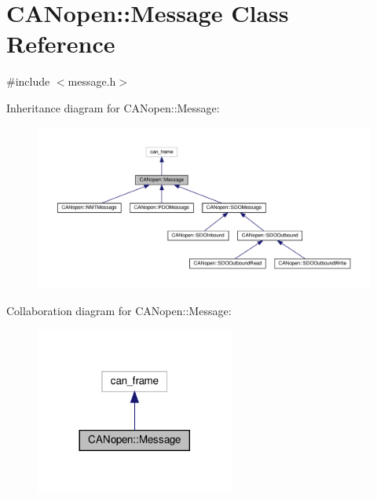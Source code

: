\hypertarget{class_c_a_nopen_1_1_message}{}\section{C\+A\+Nopen\+:\+:Message Class Reference}
\label{class_c_a_nopen_1_1_message}


{\ttfamily \#include $<$message.\+h$>$}



Inheritance diagram for C\+A\+Nopen\+:\+:Message\+:\nopagebreak
\begin{figure}[H]
\begin{center}
\leavevmode
\includegraphics[width=350pt]{class_c_a_nopen_1_1_message__inherit__graph}
\end{center}
\end{figure}


Collaboration diagram for C\+A\+Nopen\+:\+:Message\+:\nopagebreak
\begin{figure}[H]
\begin{center}
\leavevmode
\includegraphics[width=185pt]{class_c_a_nopen_1_1_message__coll__graph}
\end{center}
\end{figure}
